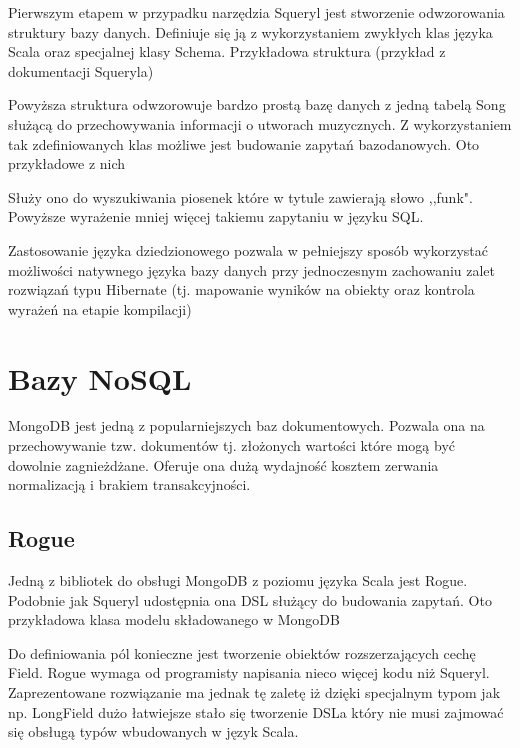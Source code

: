 \documentclass[brudnopis]{xmgr}
\begin{document}
Pierwszym etapem w przypadku narzędzia Squeryl jest stworzenie odwzorowania struktury bazy danych. Definiuje się ją z wykorzystaniem zwykłych klas języka Scala oraz specjalnej klasy Schema. Przykładowa struktura (przykład z dokumentacji Squeryla)



Powyższa struktura odwzorowuje bardzo prostą bazę danych z jedną tabelą Song służącą do przechowywania informacji o utworach muzycznych. Z wykorzystaniem tak zdefiniowanych klas możliwe jest budowanie zapytań bazodanowych. Oto przykładowe z nich



Służy ono do wyszukiwania piosenek które w tytule zawierają słowo ,,funk". Powyższe wyrażenie mniej więcej takiemu zapytaniu w języku SQL.



Zastosowanie języka dziedzionowego pozwala w pełniejszy sposób wykorzystać możliwości natywnego języka bazy danych przy jednoczesnym zachowaniu zalet rozwiązań typu Hibernate (tj. mapowanie wyników na obiekty oraz kontrola wyrażeń na etapie kompilacji)

\section{Bazy NoSQL}

MongoDB jest jedną z popularniejszych baz dokumentowych. Pozwala ona na przechowywanie tzw. dokumentów tj. złożonych wartości które mogą być dowolnie zagnieżdżane. Oferuje ona dużą wydajność kosztem zerwania normalizacją i brakiem transakcyjności.

\subsection{Rogue}
Jedną z bibliotek do obsługi MongoDB z poziomu języka Scala jest Rogue. Podobnie jak Squeryl udostępnia ona DSL służący do budowania zapytań. Oto przykładowa klasa modelu składowanego w MongoDB



Do definiowania pól konieczne jest tworzenie obiektów rozszerzających cechę Field. Rogue wymaga od programisty napisania nieco więcej kodu niż Squeryl. Zaprezentowane rozwiązanie ma jednak tę zaletę iż dzięki specjalnym typom jak np. LongField dużo łatwiejsze stało się tworzenie DSLa który nie musi zajmować się obsługą typów wbudowanych w język Scala.
\end{document}
